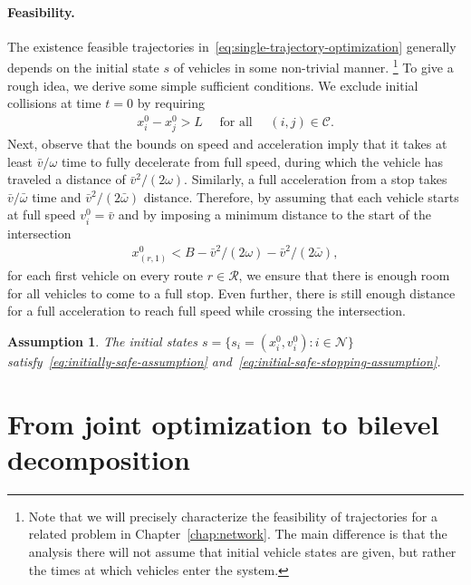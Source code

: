 \documentclass[a4paper]{report}
\theoremstyle{definition}
\theoremstyle{plain}
\newtheorem{assump}{Assumption}[chapter]
\begin{document}
\paragraph{Feasibility.}
The existence feasible trajectories in~\eqref{eq:single-trajectory-optimization} generally depends on the initial
state $s$ of vehicles in some non-trivial manner.%
\footnote{Note that we will precisely characterize the feasibility of
  trajectories for a related problem in Chapter~\ref{chap:network}.
%
  The main difference is that the analysis there will not assume that initial
  vehicle states are given, but rather the times at which vehicles enter the
  system.}
%
To give a rough idea, we derive some simple sufficient conditions.
We exclude initial collisions at time $t=0$ by requiring
\begin{align}\label{eq:initially-safe-assumption}
 x_{i}^{0} - x_{j}^{0} > L \quad \text{ for all } \quad  (i,j) \in \mathcal{C} .
\end{align}
%
%
Next, observe that the bounds on speed and acceleration imply that it takes at
least $\bar{v}/\omega$ time to fully decelerate from full speed, during which the
vehicle has traveled a distance of $\bar{v}^2/(2\omega)$. Similarly, a full
acceleration from a stop takes $\bar{v}/\bar{\omega}$ time and
$\bar{v}^2/(2\bar{\omega})$ distance.
%
Therefore, by assuming that each vehicle starts at full speed
$v_{i}^{0} = \bar{v}$ and by imposing a minimum distance to the start of the
intersection
\begin{align}\label{eq:initial-safe-stopping-assumption}
  x_{(r,1)}^{0} < B - \bar{v}^2/(2\omega) - \bar{v}^2/(2\bar{\omega}),
\end{align}
for each first vehicle on every route
$r \in \mathcal{R}$, we ensure that there is enough room for all vehicles to
come to a full stop. Even further, there is still enough distance for a full
acceleration to reach full speed while crossing the intersection.
%

\begin{assump}\label{assump:feasible}
  The initial states $s=\{s_i = (x_i^0,v_i^0) : i \in \mathcal{N} \}$
  satisfy~\eqref{eq:initially-safe-assumption}
  and~\eqref{eq:initial-safe-stopping-assumption}.
\end{assump}


\pagebreak
\section{From joint optimization to bilevel decomposition}
\end{document}
